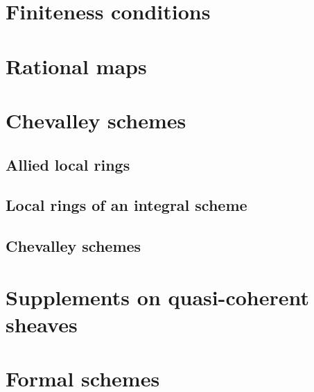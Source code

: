 \documentclass[10pt,oneside]{amsart}
\begin{document}
    \section{Finiteness conditions}

    \section{Rational maps}

    \section{Chevalley schemes}

        \subsection{Allied local rings}
        

        \subsection{Local rings of an integral scheme}
        

        \subsection{Chevalley schemes}
        

    \section{Supplements on quasi-coherent sheaves}

    \section{Formal schemes}
\end{document}
